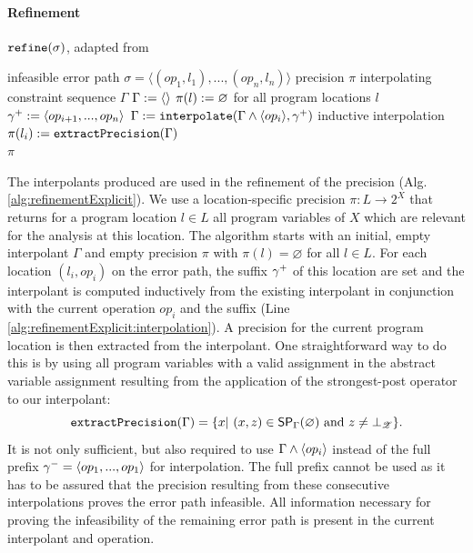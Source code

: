 \paragraph*{Refinement}
\begin{algorithm}[t]
\caption{$\texttt{refine}(\sigma)$, adapted from \cite{Beyer2015}}
\label{alg:refinementExplicit}
\begin{algorithmic}[1]
\Input infeasible error path $\sigma = \langle (op_1, l_1), ..., (op_n, l_n) \rangle$
\Output precision $\pi$
\Variables interpolating constraint sequence $\Gamma$
\State $\Gamma := \langle \rangle$
\State $\pi(l) := \varnothing$ for all program locations $l$
\label{alg:refinementExplicit:loopStart}
	\State ${\gamma^{+}} := \langle op_{i+1}, ..., op_n \rangle$
	\State $\Gamma := \texttt{interpolate}(\Gamma \wedge \langle op_i \rangle, {\gamma^{+}})$ \Comment inductive interpolation \label{alg:refinementExplicit:interpolation}
	\State $\pi(l_i) := \texttt{extractPrecision}(\Gamma)$
\EndFor\\
\Return $\pi$
\end{algorithmic}
\end{algorithm}

The interpolants produced are used in the refinement of the precision (Alg. \ref{alg:refinementExplicit}).
We use a location-specific precision $\pi : L \rightarrow 2^X$ that returns for a program location $l \in L$ all program variables of $X$ which are relevant for the analysis at this location. 
The algorithm starts with an initial, empty interpolant $\Gamma$ and empty precision $\pi$ with $\pi(l) = \varnothing$ for all $l \in L$.
For each location $(l_i, op_i)$ on the error path, the suffix ${\gamma^{+}}$ of this location are set and the interpolant is computed inductively from the existing interpolant in conjunction with the current operation $op_i$ and the suffix (Line \ref{alg:refinementExplicit:interpolation}).
A precision for the current program location is then extracted from the interpolant.
One straightforward way to do this is by using all program variables with a valid assignment in the  abstract variable assignment resulting from the application of the strongest-post operator to our interpolant:
\[\texttt{extractPrecision}(\Gamma) = \{ x |\ (x, z) \in \operatorname{\operatorname{\operatorname{\mathsf{SP}}}}_\Gamma (\varnothing ) \text{ and } z \neq \bot_{\mathscr{Z}} \}.\]
It is not only sufficient, but also required to use $\Gamma \wedge \langle op_i \rangle$ instead of the full prefix ${\gamma^{-}} = \langle op_1, ..., op_1 \rangle$ for interpolation. The full prefix cannot be used as it has to be assured that the precision resulting from these consecutive interpolations proves the error path infeasible. All information necessary for proving the infeasibility of the remaining error path is present in the current interpolant and operation.

